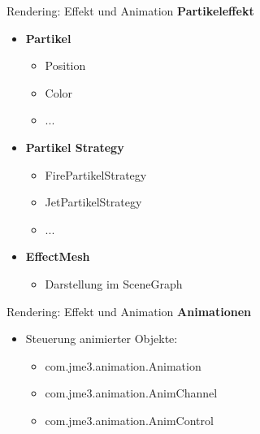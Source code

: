 \documentclass[10pt]{beamer}
\begin{document}
\begin{frame}[fragile]{Rendering: Effekt und Animation}
    \textbf{Partikeleffekt}
    \begin{itemize}
        \item \textbf{Partikel}
        \begin{itemize}
            \item Position
            \item Color
            \item ...\par
        \end{itemize}
        \item \textbf{Partikel Strategy}
        \begin{itemize}
            \item FirePartikelStrategy
            \item JetPartikelStrategy
            \item ...
        \end{itemize}
        \item \textbf{EffectMesh}
        \begin{itemize}
            \item Darstellung im SceneGraph
        \end{itemize}
    \end{itemize}
\end{frame}


\begin{frame}[fragile]{Rendering: Effekt und Animation}
    \textbf{Animationen}
    \begin{itemize}
        \item Steuerung animierter Objekte:
        \begin{itemize}
            \item com.jme3.animation.Animation
            \item com.jme3.animation.AnimChannel
            \item com.jme3.animation.AnimControl
        \end{itemize}
    \end{itemize}
\end{frame}
\end{document}
